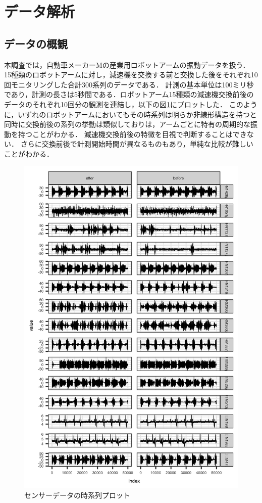 \documentclass{jarticle}
\begin{document}
\section{データ解析}

\subsection{データの概観}
本調査では，自動車メーカーMの産業用ロボットアームの振動データを扱う．
15種類のロボットアームに対し，減速機を交換する前と交換した後をそれぞれ10回モニタリングした合計300系列のデータである．
計測の基本単位は100ミリ秒であり，計測の長さは5秒間である．ロボットアーム15種類の減速機交換前後のデータのそれぞれ10回分の観測を連結し，以下の図\ref{fig:ts}にプロットした．
このように，いずれのロボットアームにおいてもその時系列は明らか非線形構造を持つと同時に交換前後の系列の挙動は類似しておりは，アームごとに特有の周期的な振動を持つことがわかる．
減速機交換前後の特徴を目視で判断することはできない．
さらに交換前後で計測開始時間が異なるものもあり，単純な比較が難しいことがわかる．
\begin{figure}[htbp]
\begin{center}
	\includegraphics[width=12cm]{fig/ts.png}	
	\caption{センサーデータの時系列プロット\label{fig:ts}}
\end{center}
\end{figure}
\end{document}
